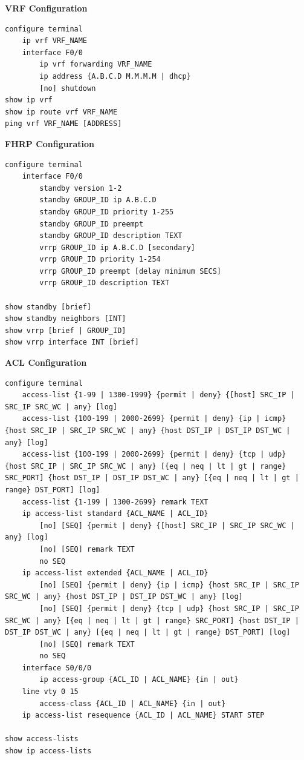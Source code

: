 \documentclass[12pt]{article}
\begin{document}
	\textbf{VRF Configuration}
	\begin{lstlisting}
configure terminal
	ip vrf VRF_NAME
	interface F0/0
		ip vrf forwarding VRF_NAME
		ip address {A.B.C.D M.M.M.M | dhcp}
		[no] shutdown
show ip vrf
show ip route vrf VRF_NAME
ping vrf VRF_NAME [ADDRESS]
	\end{lstlisting}

	\textbf{FHRP Configuration}
	\begin{lstlisting}
configure terminal
	interface F0/0
		standby version 1-2
		standby GROUP_ID ip A.B.C.D
		standby GROUP_ID priority 1-255
		standby GROUP_ID preempt
		standby GROUP_ID description TEXT
		vrrp GROUP_ID ip A.B.C.D [secondary]
		vrrp GROUP_ID priority 1-254
		vrrp GROUP_ID preempt [delay minimum SECS]
		vrrp GROUP_ID description TEXT

show standby [brief]
show standby neighbors [INT]
show vrrp [brief | GROUP_ID]
show vrrp interface INT [brief]
	\end{lstlisting}

	\textbf{ACL Configuration}
	\begin{lstlisting}
configure terminal
	access-list {1-99 | 1300-1999} {permit | deny} {[host] SRC_IP | SRC_IP SRC_WC | any} [log]
	access-list {100-199 | 2000-2699} {permit | deny} {ip | icmp} {host SRC_IP | SRC_IP SRC_WC | any} {host DST_IP | DST_IP DST_WC | any} [log]
	access-list {100-199 | 2000-2699} {permit | deny} {tcp | udp} {host SRC_IP | SRC_IP SRC_WC | any} [{eq | neq | lt | gt | range} SRC_PORT] {host DST_IP | DST_IP DST_WC | any} [{eq | neq | lt | gt | range} DST_PORT] [log]
	access-list {1-199 | 1300-2699} remark TEXT
	ip access-list standard {ACL_NAME | ACL_ID}
		[no] [SEQ] {permit | deny} {[host] SRC_IP | SRC_IP SRC_WC | any} [log]
		[no] [SEQ] remark TEXT
		no SEQ
	ip access-list extended {ACL_NAME | ACL_ID}
		[no] [SEQ] {permit | deny} {ip | icmp} {host SRC_IP | SRC_IP SRC_WC | any} {host DST_IP | DST_IP DST_WC | any} [log]
		[no] [SEQ] {permit | deny} {tcp | udp} {host SRC_IP | SRC_IP SRC_WC | any} [{eq | neq | lt | gt | range} SRC_PORT] {host DST_IP | DST_IP DST_WC | any} [{eq | neq | lt | gt | range} DST_PORT] [log]
		[no] [SEQ] remark TEXT
		no SEQ
	interface S0/0/0
		ip access-group {ACL_ID | ACL_NAME} {in | out}
	line vty 0 15
		access-class {ACL_ID | ACL_NAME} {in | out}
	ip access-list resequence {ACL_ID | ACL_NAME} START STEP

show access-lists
show ip access-lists
	\end{lstlisting}
\end{document}
